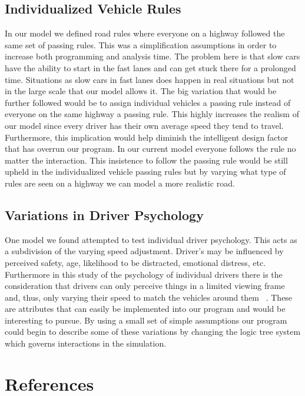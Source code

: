 \documentclass{amsart}
\begin{document}
	\subsection{Individualized Vehicle Rules}
	In our model we defined road rules where everyone on a highway followed the same set of passing rules. This was a simplification assumptions in order to increase both programming and analysis time. The problem here is that slow cars have the ability to start in the fast lanes and can get stuck there for a prolonged time. Situations as slow cars in fast lanes does happen in real situations but not in the large scale that our model allows it. 
	The big variation that would be further followed would be to assign individual vehicles a passing rule instead of everyone on the same highway a passing rule. This highly increases the realism of our model since every driver has their own average speed they tend to travel. Furthermore, this implication would help diminish the intelligent design factor that has overrun our program. In our current model everyone follows the rule no matter the interaction. This insistence to follow the passing rule would be still upheld in the individualized vehicle passing rules but by varying what type of rules are seen on a highway we can model a more realistic road. 
	
	\subsection{Variations in Driver Psychology}
	One model we found attempted to test individual driver psychology. This acts as a subdivision of the varying speed adjustment. Driver's may be influenced by perceived safety, age, likelihood to be distracted, emotional distress, etc. Furthermore in this study of the psychology of individual drivers there is the consideration that drivers can only perceive things in a limited viewing frame and, thus, only varying their speed to match the vehicles around them ~\cite{burghout2005}. These are attributes that can easily be implemented into our program and would be interesting to pursue. By using a small set of simple assumptions our program could begin to describe some of these variations by changing the logic tree system which governs interactions in the simulation.  

\newpage
\section{\bfseries{References}}

\end{document}
